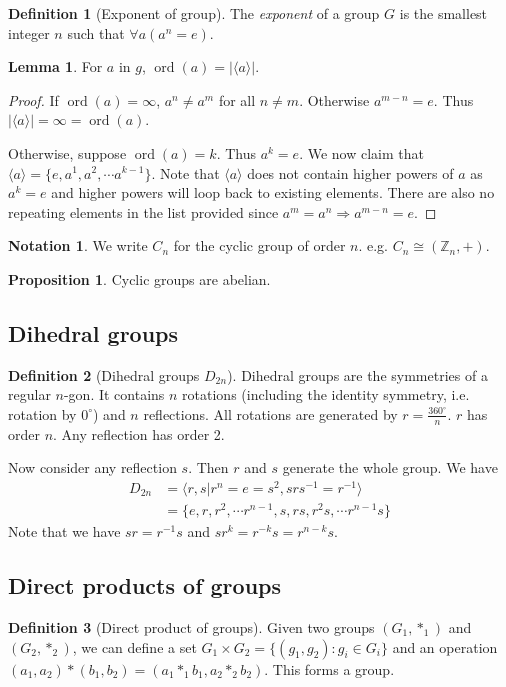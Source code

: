\documentclass[a4paper]{article}
\theoremstyle{definition}
\newtheorem*{prop}{Proposition}
\newtheorem*{defi}{Definition}
\newtheorem*{lemma}{Lemma}
\newtheorem*{notation}{Notation}
\newcommand{\Z}{\mathbb{Z}}
\newcommand{\bra}{\langle}
\newcommand{\ket}{\rangle}
\DeclareMathOperator\ord{ord}
\begin{document}
\begin{defi}[Exponent of group]
  The \emph{exponent} of a group $G$ is the smallest integer $n$ such that $\forall a(a^n = e)$.
\end{defi}
\begin{lemma}
  For $a$ in $g$, $\ord (a) = |\bra a\ket|$.
\end{lemma}
\begin{proof}
  If $\ord (a) = \infty$, $a^n \not= a^m$ for all $n\not= m$. Otherwise $a^{m-n} = e$. Thus $|\bra a\ket| = \infty = \ord (a)$.

Otherwise, suppose $\ord (a) = k$. Thus $a^k = e$. We now claim that $\bra a\ket = \{e, a^1, a^2, \cdots a^{k-1}\}$. Note that $\bra a\ket$ does not contain higher powers of $a$ as $a^k = e$ and higher powers will loop back to existing elements. There are also no repeating elements in the list provided since $a^m = a^n \Rightarrow a^{m-n} = e$.
\end{proof}

\begin{notation}
  We write $C_n$ for the cyclic group of order $n$. e.g. $C_n \cong (\Z_n, +)$.
\end{notation}

\begin{prop}
  Cyclic groups are abelian.
\end{prop}

\subsection{Dihedral groups}
\begin{defi}[Dihedral groups $D_{2n}$]
  Dihedral groups are the symmetries of a regular $n$-gon. It contains $n$ rotations (including the identity symmetry, i.e. rotation by $0^\circ$) and $n$ reflections. All rotations are generated by $r = \frac{360^\circ}{n}$. $r$ has order $n$. Any reflection has order 2.

Now consider any reflection $s$. Then $r$ and $s$ generate the whole group. We have
\begin{align*}
 D_{2n} &= \bra r, s|r^n=e=s^2, srs^{-1} = r^{-1}\ket\\
  &= \{e, r, r^2, \cdots r^{n-1}, s, rs, r^2s, \cdots r^{n-1}s\}
\end{align*}
Note that we have $sr=r^{-1}s$ and $sr^k = r^{-k}s = r^{n-k}s$.
\end{defi}

\subsection{Direct products of groups}
\begin{defi}[Direct product of groups]
  Given two groups $(G_1, *_1)$ and $(G_2, *_2)$, we can define a set $G_1\times G_2 = \{(g_1, g_2): g_i\in G_i\}$ and an operation $(a_1, a_2)*(b_1, b_2) = (a_1*_1b_1, a_2*_2b_2)$. This forms a group.
\end{defi}
\end{document}
